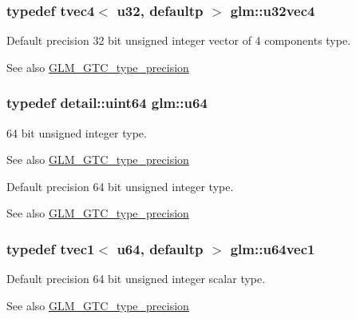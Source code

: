 \subsubsection[{u32vec4}]{\setlength{\rightskip}{0pt plus 5cm}typedef tvec4$<$ u32, defaultp $>$ {\bf glm\+::u32vec4}}\label{group__gtc__type__precision_ga6e966cda0025699449a36b41f1787927}
Default precision 32 bit unsigned integer vector of 4 components type. \begin{DoxySeeAlso}{See also}
\hyperlink{group__gtc__type__precision}{G\+L\+M\+\_\+\+G\+T\+C\+\_\+type\+\_\+precision} 
\end{DoxySeeAlso}
\hypertarget{group__gtc__type__precision_ga71cedd4972f9cb1a5e14dfe5ab83ecd7}{}
\subsubsection[{u64}]{\setlength{\rightskip}{0pt plus 5cm}typedef detail\+::uint64 {\bf glm\+::u64}}\label{group__gtc__type__precision_ga71cedd4972f9cb1a5e14dfe5ab83ecd7}
64 bit unsigned integer type. \begin{DoxySeeAlso}{See also}
\hyperlink{group__gtc__type__precision}{G\+L\+M\+\_\+\+G\+T\+C\+\_\+type\+\_\+precision}
\end{DoxySeeAlso}
Default precision 64 bit unsigned integer type. \begin{DoxySeeAlso}{See also}
\hyperlink{group__gtc__type__precision}{G\+L\+M\+\_\+\+G\+T\+C\+\_\+type\+\_\+precision} 
\end{DoxySeeAlso}
\hypertarget{group__gtc__type__precision_gaf0a59fdb715cf4ddf0c4dabf0e2286a9}{}
\subsubsection[{u64vec1}]{\setlength{\rightskip}{0pt plus 5cm}typedef tvec1$<$ u64, defaultp $>$ {\bf glm\+::u64vec1}}\label{group__gtc__type__precision_gaf0a59fdb715cf4ddf0c4dabf0e2286a9}
Default precision 64 bit unsigned integer scalar type. \begin{DoxySeeAlso}{See also}
\hyperlink{group__gtc__type__precision}{G\+L\+M\+\_\+\+G\+T\+C\+\_\+type\+\_\+precision} 
\end{DoxySeeAlso}
\hypertarget{group__gtc__type__precision_gaddd85665767e5d32aee8516f00c45f59}{}
